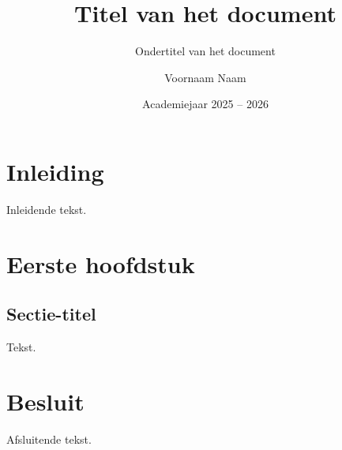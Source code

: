 \documentclass[twoside, kulak]{kulakreport} %
\title{Titel van het document}
\subtitle{Ondertitel van het document}
\author{Voornaam Naam}
\date{Academiejaar 2025 -- 2026}
\institute{Naam van de opleiding}
\begin{document}
\titlepage

\tableofcontents

\chapter*{Inleiding}
Inleidende tekst.

\chapter{Eerste hoofdstuk}
\section{Sectie-titel}
Tekst.

\chapter*{Besluit}
Afsluitende tekst.
\end{document}
